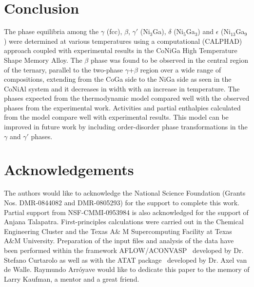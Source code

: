 \documentclass[article]{elsarticle}
\begin{document}
\section{Conclusion}
\label{Sec:conclusion}
The phase equilibria among the $\gamma$ (fcc), $\beta$, $\gamma'$ (Ni$_3$Ga),
$\delta$ (Ni$_{5}$Ga$_{3}$) and $\epsilon$ (Ni$_{13}$Ga$_{9}$) were determined
at various temperatures using a computational (CALPHAD) approach coupled with
experimental results in the CoNiGa High Temperature Shape Memory Alloy.
The $\beta$ phase was found to be observed in the central region of the ternary,
parallel to the two-phase $\gamma$+$\beta$ region over a wide range of compositions,
extending from the CoGa side to the NiGa side as seen in the CoNiAl system and
it decreases in width with an increase in temperature. The phases expected from
the thermodynamic model compared well with the observed phases from the experimental work.
Activities and partial enthalpies calculated from the model compare well with experimental
results. This model can be improved in future work by including order-disorder phase transformations in the
$\gamma$ and $\gamma'$ phases.
\section{Acknowledgements}
The authors would like to acknowledge the National Science Foundation (Grants Nos. DMR-0844082 and DMR-0805293) for the support to complete this work. Partial support from NSF-CMMI-0953984 is also acknowledged for the support of Anjana Talapatra. First-principles calculations were carried out in the Chemical Engineering Cluster and the Texas A\& M Supercomputing Facility at Texas A\&M University.  Preparation of the input files and analysis of the data have been performed within the framework AFLOW/ACONVASP~\cite{ra-stefano} developed by Dr. Stefano Curtarolo as well as with the ATAT package~\cite{ra-atat2} developed by Dr. Axel van de Walle. Raymundo Arróyave would like to dedicate this paper to the memory of Larry Kaufman, a mentor and a great friend.
\end{document}
